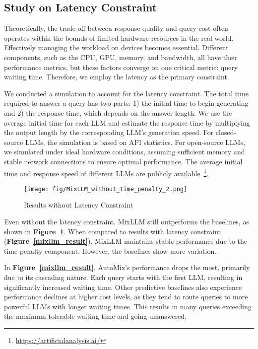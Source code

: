 \subsection{Study on Latency Constraint}

Theoretically, the trade-off between response quality and query cost often operates within the bounds of limited hardware resources in the real world. Effectively managing the workload on devices becomes essential. Different components, such as the CPU, GPU, memory, and bandwidth, all have their performance metrics, but these factors converge on one critical metric: query waiting time. Therefore, we employ the latency as the primary constraint.


We conducted a simulation to account for the latency constraint.
The total time required to answer a query has two parts: 1) the initial time to begin generating and 2) the response time, which depends on the answer length.
We use the average initial time for each LLM and estimate the response time by multiplying the output length by the corresponding LLM’s generation speed.
For closed-source LLMs, the simulation is based on API statistics. For open-source LLMs, we simulated under ideal hardware conditions, assuming sufficient memory and stable network connections to ensure optimal performance.
The average initial time and response speed of different LLMs are publicly available~\footnote{\url{https://artificialanalysis.ai/}}. 



\begin{figure}[htbp]
\centering
\texttt{[image: fig/MixLLM\_without\_time\_penalty\_2.png]}
\caption{Results without Latency Constraint}
\label{mixllm_no_latency}
\end{figure}

Even without the latency constraint, MixLLM still outperforms the baselines, as shown in \textbf{Figure~\ref{mixllm_no_latency}}. 
When compared to results with latency constraint (\textbf{Figure~\ref{mixllm_result}}), MixLLM maintains stable performance due to the time penalty component. 
However, the baselines show more variation.

In \textbf{Figure~\ref{mixllm_result}}, AutoMix's performance drops the most, primarily due to its cascading nature. Each query starts with the first LLM, resulting in significantly increased waiting time. 
Other predictive baselines also experience performance declines at higher cost levels, as they tend to route queries to more powerful LLMs with longer waiting times. This results in many queries exceeding the maximum tolerable waiting time and going unanswered.



